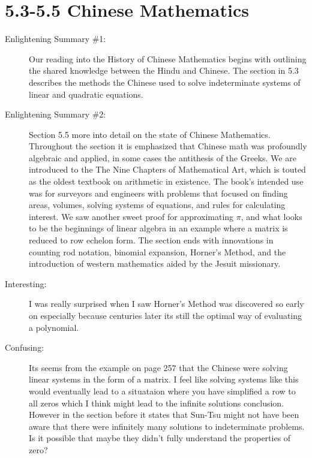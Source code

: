 \documentclass[12pt]{article}
\theoremstyle{homework}
\begin{document}
\section*{5.3-5.5 Chinese Mathematics}

\begin{description}

\item[Enlightening Summary \#1:] Our reading into the History of Chinese Mathematics begins with outlining the shared knowledge
between the Hindu and Chinese. The section in 5.3 describes the methods the Chinese used to solve indeterminate systems 
of linear and quadratic equations.\\

\item[Enlightening Summary \#2:] Section 5.5 more into detail on the state of Chinese Mathematics. Throughout the section it 
is emphasized that Chinese math was profoundly algebraic and applied, in some cases the antithesis of the Greeks. We are introduced to the
The Nine Chapters of Mathematical Art, which is touted as the oldest textbook on arithmetic in existence. The book's intended use was for 
surveyors and engineers with problems that focused on finding areas, volumes, solving systems of equations, and rules for calculating interest.
We saw another sweet proof for approximating $\pi$, and what looks to be the beginnings of linear algebra in an example where a matrix is reduced to row echelon form.
The section ends with innovations in counting rod notation, binomial expansion, Horner's Method, and the introduction of western mathematics aided by the Jesuit missionary.\\   


\item[Interesting:] I was really surprised when I saw Horner's Method was discovered so early on especially because centuries later its still 
the optimal way of evaluating a polynomial.  


\item[Confusing:] Its seems from the example on page 257 that the Chinese were solving linear systems in the form of a matrix. I feel like solving systems like this would eventually lead to a situataion where 
you have simplified a row to all zeros which I think might lead to the infinite solutions conclusion. However in the section 
before it states that Sun-Tsu might not have been aware that there were infinitely many solutions to indeterminate problems. Is it possible that maybe they didn't 
fully understand the properties of zero?  


\end{description}
\end{document}
